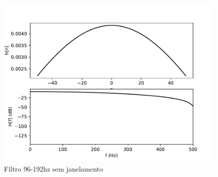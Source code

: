 \begin{figure}[H]
        \begin{center}
            \includegraphics[scale=0.4]{fig/100/Hamming/filter2.pdf}\\
            \small{Filtro 96-192hz sem janelamento}
    

\end{center}
\end{figure}
